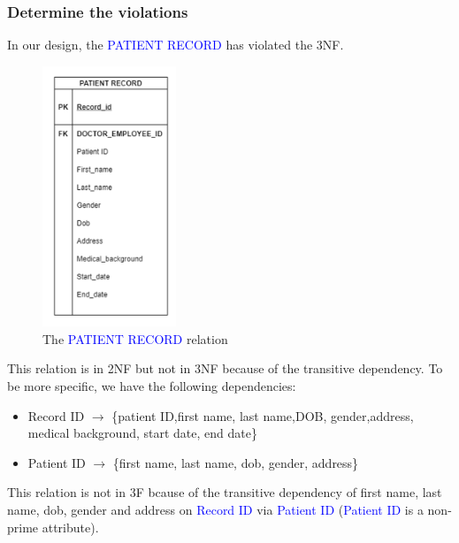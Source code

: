 \documentclass[a4paper]{article}
\numberwithin{equation}{section}
\begin{document}
\subsubsection{Determine the violations}
In our design, the \textcolor{blue}{PATIENT RECORD} has violated the 3NF\@.
\begin{figure}[H]
  \centering
  \includegraphics[width = 4cm ]{assets/3NFviolation.PNG}
  \caption{The \textcolor{blue}{PATIENT RECORD} relation}
\end{figure}

This relation is in 2NF but not in 3NF because of the transitive
dependency. To be more specific, we have the following dependencies:  \begin{itemize}
  \item Record ID \(\rightarrow \) \{patient ID,first name, last name,DOB, gender,address, medical background, start date, end date\}
  \item Patient ID \(\rightarrow \) \{first name, last name, dob, gender, address\}
\end{itemize}
This relation is not in 3F bcause of the transitive dependency of first name, last name, dob, gender and address on \textcolor{blue}{Record ID} via \textcolor{blue}{Patient ID} (\textcolor{blue}{Patient ID} is a non-prime attribute).
\end{document}
